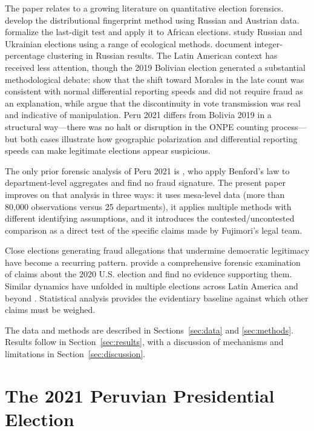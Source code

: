 \documentclass[12pt]{article}
\begin{document}
The paper relates to a growing literature on quantitative election forensics.
\citet{klimek2012} develop the distributional fingerprint method using Russian
and Austrian data. \citet{beber2012} formalize the last-digit test and apply
it to African elections. \citet{myagkov2009} study Russian and Ukrainian
elections using a range of ecological methods. \citet{kobak2016} document
integer-percentage clustering in Russian results. The Latin American context
has received less attention, though the 2019 Bolivian election generated a
substantial methodological debate: \citet{idrobo2022} show that the shift
toward Morales in the late count was consistent with normal differential
reporting speeds and did not require fraud as an explanation, while
\citet{escobari2024} argue that the discontinuity in vote transmission was
real and indicative of manipulation. Peru 2021 differs from Bolivia 2019 in a
structural way---there was no halt or disruption in the ONPE counting
process---but both cases illustrate how geographic polarization and
differential reporting speeds can make legitimate elections appear suspicious.

The only prior forensic analysis of Peru 2021 is \citet{isea2021}, who apply
Benford's law to department-level aggregates and find no fraud signature. The
present paper improves on that analysis in three ways: it uses mesa-level data
(more than 80,000 observations versus 25 departments), it applies multiple
methods with different identifying assumptions, and it introduces the
contested/uncontested comparison as a direct test of the specific claims made
by Fujimori's legal team.

Close elections generating fraud allegations that undermine democratic
legitimacy have become a recurring pattern. \citet{eggers2021} provide a
comprehensive forensic examination of claims about the 2020 U.S. election and
find no evidence supporting them. Similar dynamics have unfolded in multiple
elections across Latin America and beyond \citep{lehoucq2003, hyde2007}.
Statistical analysis provides the evidentiary baseline against which other
claims must be weighed.

The data and methods are described in Sections~\ref{sec:data} and
\ref{sec:methods}. Results follow in Section~\ref{sec:results}, with a
discussion of mechanisms and limitations in Section~\ref{sec:discussion}.

\section{The 2021 Peruvian Presidential Election}
\label{sec:background}
\end{document}
